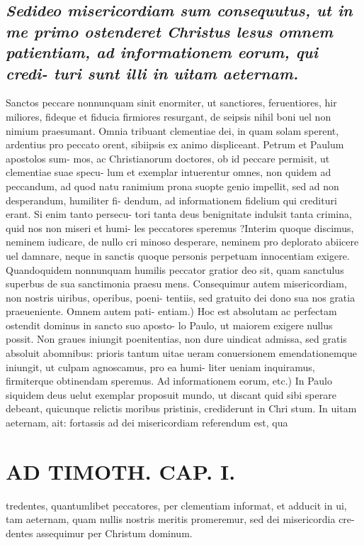 \documentclass{article}
\begin{document}
\begin{pages}
\subsection*{\textit{Sedideo misericordiam sum consequutus, ut in me primo ostenderet Christus lesus omnem patientiam, ad informationem eorum, qui credi- turi sunt illi in uitam aeternam. }}\pstart Sanctos peccare nonnunquam sinit enormiter, ut sanctiores, feruentiores, hir miliores, fideque et fiducia firmiores resurgant, de seipsis nihil boni uel non nimium praesumant. Omnia tribuant clementiae dei, in quam solam sperent, ardentius pro peccato orent, sibiipsis ex animo displiceant. Petrum et Paulum apostolos sum- mos, ac Christianorum doctores, ob id peccare permisit, ut clementiae suae specu- lum et exemplar intuerentur omnes, non quidem ad peccandum, ad quod natu ranimium prona suopte genio impellit, sed ad non desperandum, humiliter fi- dendum, ad informationem fidelium qui credituri erant. Si enim tanto persecu- tori tanta deus benignitate indulsit tanta crimina, quid nos non miseri et humi- les peccatores speremus ?Interim quoque discimus, neminem iudicare, de nullo cri minoso desperare, neminem pro deplorato abiicere uel damnare, neque in sanctis quoque personis perpetuam innocentiam exigere. Quandoquidem nonnunquam humilis peccator gratior deo sit, quam sanctulus superbus de sua sanctimonia praesu mens. Consequimur autem misericordiam, non nostris uiribus, operibus, poeni- tentiis, sed gratuito dei dono sua nos gratia praeueniente. Omnem autem pati- entiam.) Hoc est absolutam ac perfectam ostendit dominus in sancto suo aposto- lo Paulo, ut maiorem exigere nullus possit. Non graues iniungit poenitentias, non dure uindicat admissa, sed gratis absoluit abomnibus: prioris tantum uitae ueram conuersionem emendationemque iniungit, ut culpam agnoscamus, pro ea humi- liter ueniam inquiramus, firmiterque obtinendam speremus. Ad informationem eorum, etc.) In Paulo siquidem deus uelut exemplar proposuit mundo, ut discant quid sibi sperare debeant, quicunque relictis moribus pristinis, crediderunt in Chri stum. In uitam aeternam, ait: fortassis ad dei misericordiam referendum est, qua  \pend
\section*{AD TIMOTH. CAP. I. }
\marginpar{[ p.477 ]}\pstart tredentes, quantumlibet peccatores, per clementiam informat, et adducit in ui, tam aeternam, quam nullis nostris meritis promeremur, sed dei misericordia cre- dentes assequimur per Christum dominum.  \pend
{}
{}

\end{pages}
\end{document}
